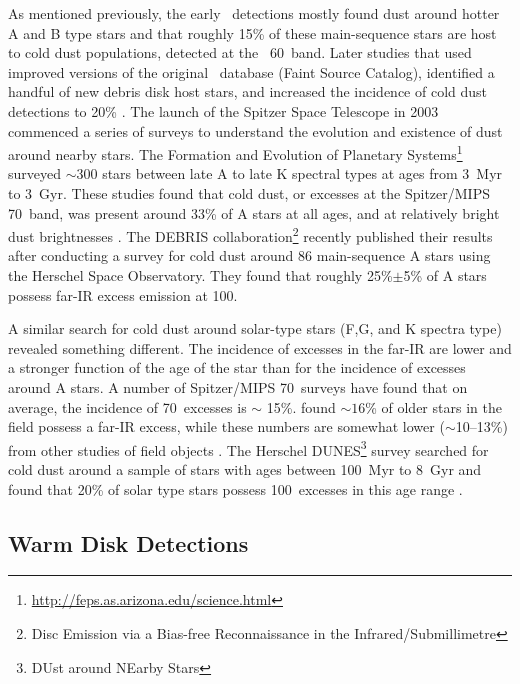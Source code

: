    As mentioned previously, the early \iras\ detections mostly found dust around hotter A and B type stars and that roughly 15\% of these main-sequence stars are host to cold dust populations, detected at the \iras\ 60\micron\ band. Later studies that used improved versions of the original \iras\ database (Faint Source Catalog), identified a handful of new debris disk host stars, and increased the incidence of cold dust detections to 20\% \citep{Rhee2007}. The launch of the Spitzer Space Telescope in 2003 commenced a series of surveys to understand the evolution and existence of dust around nearby stars. The Formation and Evolution of Planetary Systems\footnote{\url{http://feps.as.arizona.edu/science.html}} \citep[FEPS;][]{Meyer2006} surveyed $\sim$300 stars between late A to late K spectral types at ages from 3~Myr to 3~Gyr. These studies found that cold dust, or excesses at the Spitzer/MIPS 70\micron\ band, was present around 33\% of A stars at all ages, and at relatively bright dust brightnesses \citep{Su2006}. The DEBRIS collaboration\footnote{Disc Emission via a Bias-free Reconnaissance in the Infrared/Submillimetre} recently published their results after conducting a survey for cold dust around 86 main-sequence A stars using the Herschel Space Observatory. They found that roughly 25\%$\pm$5\% of A stars possess far-IR excess emission at 100\micron \citep{Thureau2014}. 
   
   
   A similar search for cold dust around solar-type stars (F,G, and K spectra type) revealed something different. The incidence of excesses in the far-IR are lower and a stronger function of the age of the star than for the incidence of excesses around A stars. A number of Spitzer/MIPS 70\micron\ surveys \citep[e.g.,][]{Trilling2008, Bryden2006, Beichman2006, Hillenbrand2008} have found that on average, the incidence of 70\micron\ excesses is $\sim$ 15\%. \citet{Trilling2008} found $\sim16$\% of older stars in the field possess a far-IR excess, while these numbers are somewhat lower ($\sim$10--13\%) from other studies of field objects \citep{Beichman2006, Bryden2006}. The Herschel DUNES\footnote{DUst around NEarby Stars} survey searched for cold dust around a sample of stars with ages between 100~Myr to 8~Gyr and found that 20\% of solar type stars possess 100\micron\ excesses in this age range \citep{Eiroa2013}. 
   
   
   \subsection{Warm Disk Detections}
   

